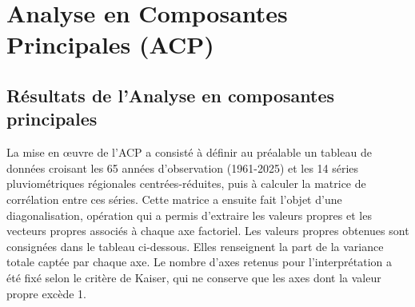 \documentclass[12pt,a4paper]{report}
\begin{document}
\clearpage
\section{Analyse en Composantes Principales (ACP)}

\subsection{Résultats de l'Analyse en composantes principales}

La mise en œuvre de l'ACP a consisté à définir au préalable un tableau de données croisant les 65 années d'observation (1961-2025) et les 14 séries pluviométriques régionales centrées-réduites, puis à calculer la matrice de corrélation entre ces séries. Cette matrice a ensuite fait l'objet d'une diagonalisation, opération qui a permis d'extraire les valeurs propres et les vecteurs propres associés à chaque axe factoriel. Les valeurs propres obtenues sont consignées dans le tableau ci-dessous. Elles renseignent la part de la variance totale captée par chaque axe. Le nombre d'axes retenus pour l'interprétation a été fixé selon le critère de Kaiser, qui ne conserve que les axes dont la valeur propre excède 1.
\end{document}
